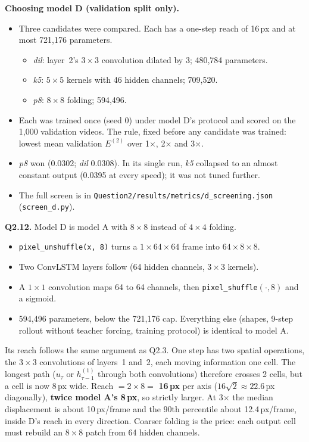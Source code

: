 \textbf{Choosing model D (validation split only).}
\begin{itemize}
\item Three candidates were compared. Each has a one-step reach of 16\,px and at most 721,176 parameters.
  \begin{itemize}
  \item \emph{dil}: layer~2's $3\times3$ convolution dilated by 3; 480,784 parameters.
  \item \emph{k5}: $5\times5$ kernels with 46 hidden channels; 709,520.
  \item \emph{p8}: $8\times8$ folding; 594,496.
  \end{itemize}
\item Each was trained once (seed 0) under model D's protocol and scored on the 1,000 validation videos. The rule,
fixed before any candidate was trained: lowest mean validation $E^{(2)}$ over 1$\times$, 2$\times$ and 3$\times$.
\item \emph{p8} won (0.0302; \emph{dil} 0.0308). In its single run, \emph{k5} collapsed to an almost constant
output (0.0395 at every speed); it was not tuned further.
\item The full screen is in \texttt{Question2/results/metrics/d\_screening.json} (\texttt{screen\_d.py}).
\end{itemize}



\textbf{Q2.12.} Model D is model A with $8\times8$ instead of $4\times4$ folding.
\begin{itemize}
\item \texttt{pixel\_unshuffle(x, 8)} turns a $1\times64\times64$ frame into $64\times8\times8$.
\item Two ConvLSTM layers follow (64 hidden channels, $3\times3$ kernels).
\item A $1\times1$ convolution maps 64 to 64 channels, then \texttt{pixel\_shuffle}$(\cdot,8)$ and a sigmoid.
\item 594,496 parameters, below the 721,176 cap. Everything else (shapes, 9-step rollout without teacher forcing,
training protocol) is identical to model A.
\end{itemize}
Its reach follows the same argument as Q2.3. One step has two spatial operations, the $3\times3$ convolutions of
layers~1 and~2, each moving information one cell. The longest path ($u_\tau$ or $h^{(1)}_{\tau-1}$ through both
convolutions) therefore crosses 2 cells, but a cell is now 8\,px wide. Reach $=2\times8=$ \textbf{16\,px} per
axis ($16\sqrt2\approx22.6$\,px diagonally), \textbf{twice model A's 8\,px}, so strictly larger. At 3$\times$ the
median displacement is about 10\,px/frame and the 90th percentile about 12.4\,px/frame, inside D's reach in every
direction. Coarser folding is the price: each output cell must rebuild an $8\times8$ patch from 64 hidden channels.


